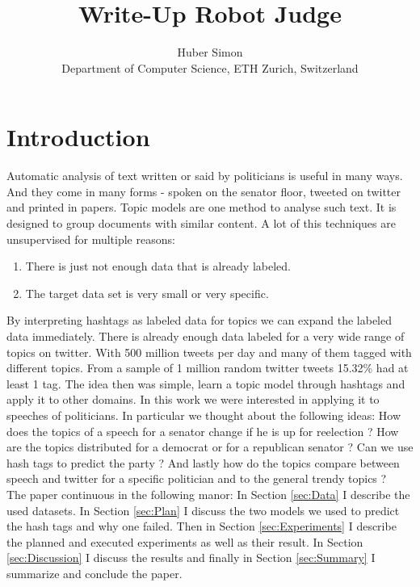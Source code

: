 \documentclass[10pt,conference,compsocconf]{IEEEtran}
\begin{document}
\title{Write-Up Robot Judge}

\author{
  Huber Simon\\
  Department of Computer Science, ETH Zurich, Switzerland
}

\maketitle

\begin{abstract}

\end{abstract}

\section{Introduction}
Automatic analysis of text written or said by politicians is useful in many ways. And they come in many forms - spoken on the senator floor, tweeted on twitter and printed in papers. 
Topic models are one method to analyse such text. It is designed to group documents with similar content. A lot of this techniques are unsupervised for multiple reasons: \begin{enumerate}
	\item There is just not enough data that is already labeled. 
	\item The target data set is very small or very specific. 
\end{enumerate} 
By interpreting hashtags as labeled data for topics we can expand the labeled data immediately. There is already enough data labeled for a very wide range of topics on twitter. With 500 million tweets per day \cite{twitter_stats} and many of them tagged with different topics. From a sample of 1 million random twitter tweets 15.32\% had at least 1 tag. The idea then was simple, learn a topic model through hashtags and apply it to other domains. In this work we were interested in applying it to speeches of politicians. In particular we thought about the following ideas: How does the topics of a speech for a senator change if he is up for reelection ? How are the topics distributed for a democrat or for a republican senator ? Can we use hash tags to predict the party ? And lastly how do the topics compare between speech and twitter for a specific politician and to the general trendy topics ? \\
The paper continuous in the following manor: In Section \ref{sec:Data} I describe the used datasets. In Section \ref{sec:Plan} I discuss the two models we used to predict the hash tags and why one failed. Then in Section \ref{sec:Experiments} I describe the planned and executed experiments as well as their result. In Section \ref{sec:Discussion} I discuss the results and finally in Section \ref{sec:Summary} I summarize and conclude the paper. 
\end{document}
